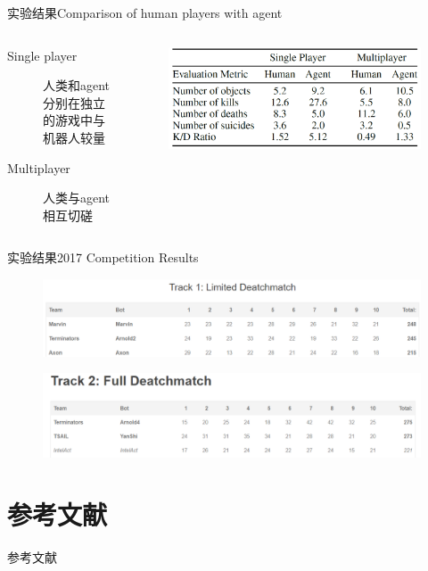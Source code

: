 \documentclass[10pt]{beamer}
\begin{document}
	\begin{frame}{实验结果}{Comparison of human players with agent}
		\begin{columns}
			\begin{column}{.5\linewidth}
				\begin{description}
					\item[Single player] 人类和agent分别在独立的游戏中与机器人较量
					
					\item[Multiplayer] 人类与agent相互切磋
					
				\end{description}
			\end{column}
			\begin{column}{.5\linewidth}
				\begin{figure}
					\centering
					\includegraphics[width=0.9\linewidth]{pictures/fps-exper-result-4}
					\caption{}
					\label{fig:fps-exper-result-4}
				\end{figure}
			\end{column}
		\end{columns}
	\end{frame}

	\begin{frame}{实验结果}{2017 Competition Results}
		\begin{figure}
			\centering
			\includegraphics[width=0.9\linewidth]{pictures/fps-exper-result-5}
		\end{figure}
		
		\begin{figure}
			\centering
			\includegraphics[width=0.9\linewidth]{pictures/fps-exper-result-6}
		\end{figure}
	\end{frame}
		
	\section*{参考文献}
	
	\begin{frame}{参考文献}
		
		
	\end{frame}
	
	{\background%
		\begin{frame}
		\end{frame}
	}
	
\end{document}
